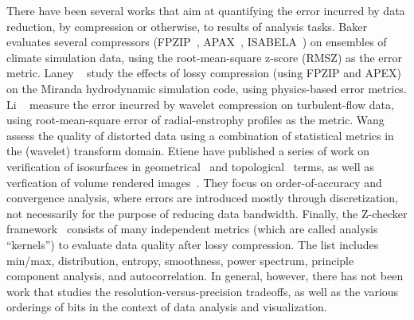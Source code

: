 There have been several works that aim at quantifying the error incurred by data reduction, by
compression or otherwise, to results of analysis tasks. Baker
\etal~\cite{evaluating-compression-climate} evaluates several compressors (FPZIP~\cite{fpzip},
APAX~\cite{apax}, ISABELA~\cite{isabela}) on ensembles of climate simulation data, using the
root-mean-square z-score (RMSZ) as the error metric. Laney \etal~\cite{compression_sim2013} study
the effects of lossy compression (using FPZIP and APEX) on the Miranda hydrodynamic simulation code,
using physics-based error metrics. Li \etal~\cite{evaluating-efficacy-wavelet} measure the error
incurred by wavelet compression on turbulent-flow data, using root-mean-square error of
radial-enstrophy profiles as the metric. Wang \etal~\cite{statistical-volume-quality} assess the
quality of distorted data using a combination of statistical metrics in the (wavelet) transform
domain. Etiene \etal have published a series of work on verification of isosurfaces in
geometrical~\cite{verifiable-isosurface} and topological~\cite{topology-verification-isosurface}
terms, as well as verfication of volume rendered images~\cite{verifying-volume-rendering}. They
focus on order-of-accuracy and convergence analysis, where errors are introduced mostly through
discretization, not necessarily for the purpose of reducing data bandwidth. Finally, the Z-checker
framework~\cite{z-checker} consists of many independent metrics (which are called analysis
``kernels'') to evaluate data quality after lossy compression. The list includes min/max,
distribution, entropy, smoothness, power spectrum, principle component analysis, and
autocorrelation. In general, however, there has not been work that studies the
resolution-versus-precision tradeoffs, as well as the various orderings of bits in the context of
data analysis and visualization.


